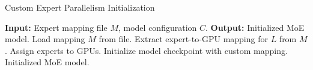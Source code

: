     



\begin{algorithm}[H]
\caption{Custom Expert Parallelism Initialization}
\label{alg:expert_parallelism_init}
\begin{algorithmic}[1]
    \STATE \textbf{Input:} Expert mapping file $M$, model configuration $C$.
    \STATE \textbf{Output:} Initialized MoE model.
    \STATE Load mapping $M$ from file.
        \STATE Extract expert-to-GPU mapping for $L$ from $M$.
        \STATE Assign experts to GPUs.
    \ENDFOR
    \STATE Initialize model checkpoint with custom mapping.
    \RETURN Initialized MoE model.
\end{algorithmic}
\end{algorithm}

\fi



